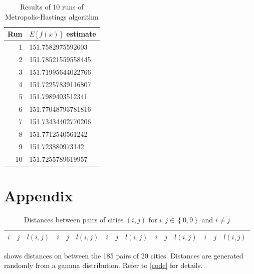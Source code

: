 \documentclass[6pt,oneside]{article}
\begin{document}
\begin{table}[h]
    \center
    \caption{Results of 10 runs of Metropolis-Hastings algorithm}
    \label{fig:results}
    \begin{tabular}{rl}
        Run & $E\left[ f(x) \right]$ estimate \\
        \hline
        1 & 151.7582975592603 \\
        2 & 151.78521559558445 \\
        3 & 151.71995644022766 \\
        4 & 151.72257839116807 \\
        5 & 151.7989403512341 \\
        6 & 151.77048793781816 \\
        7 & 151.73434402770206 \\
        8 & 151.7712540561242 \\
        9 & 151.723880973142 \\
        10 & 151.7255789619957 \\
    \end{tabular}
\end{table}

\clearpage

\section*{Appendix}

\begin{table}[h]
    \center
    \caption{Distances between pairs of cities $(i,j)$ for $i,j \in \left\lbrace 0, 9\right\rbrace$ and $i\neq j$}
    \label{table:distances}
    \footnotesize
    \begin{tabular}{ccc|ccc|ccc|ccc|ccc}
        $i$ & $j$ & $ l(i, j)$ &
        $i$ & $j$ & $ l(i, j)$ &
        $i$ & $j$ & $ l(i, j)$ &
        $i$ & $j$ & $ l(i, j)$ &
        $i$ & $j$ & $ l(i, j)$
        \\
        \hline

    \end{tabular}

    \vspace{10pt}
    \footnotesize
     shows distances on between the 185 pairs of 20 cities.
    Distances are generated randomly from a gamma distribution. Refer to \cref{code} for details.
\end{table}

\newpage


\end{document}
